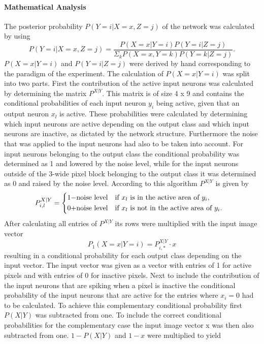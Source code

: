 \paragraph{Mathematical Analysis}
The posterior probability $P(Y = i|X = x, Z = j)$ of the network was calculated by using
\begin{equation}
\label{eqn:pYvorausgesetztXUndZ}
P(Y = i|X = x, Z = j) = \frac{P(X=x|Y=i)P(Y = i|Z = j)}{\Sigma_{k}P(X=x,Y=k)P(Y=k|Z=j)}.
\end{equation}
$P(X=x|Y=i)$ and $P(Y=i|Z=j)$ were derived by hand corresponding to the paradigm of the experiment. The calculation of $P(X=x|Y=i)$ was split into two parts. First the contribution of the active input neurons was calculated by determining the matrix $P^{X|Y}$. This matrix is of size 4 x 9 and contains the conditional probabilities of each input neuron $y_i$ being active, given that an output neuron $x_l$ is active. These probabilities were calculated by determining which input neurons are active depending on the output class and which input neurons are inactive, as dictated by the network structure.  Furthermore the noise that was applied to the input neurons had also to be taken into account. For input neurons belonging to the output class the conditional probability was determined as 1 and lowered by the noise level, while for the input neurons outside of the 3-wide pixel block belonging to the output class it was determined as 0 and raised by the noise level. According to this algorithm $P^{X|Y}$ is given by
\begin{equation}
\label{eqn:PXvorausgesetztYIf}
P_{i,l}^{X|Y} = \begin{dcases*} 1 - $noise level$ & if $x_l$ is in the active area of $y_i$, \\
0 + $noise level$ & \text{if $x_l$ is not in the active area of $ y_i $. } \end{dcases*}\end{equation}
  After calculating all entries of $P^{X|Y}$ its rows were multiplied with the input image vector
\begin{equation}
\label{eqn:p1XvorausgesetztYMalX}
P_1(X = x|Y = i) = P^{X|Y}_{i,*} \cdot x
\end{equation}
resulting in a conditional probability for each output class depending on the input vector. The input vector was given as a vector with entries of 1 for active pixels and with entries of 0 for inactive pixels.
Next to include the contribution of the input neurons that are spiking when a pixel is inactive the conditional probability of the input neurons that are active for the entries where $x_i = 0$ had to be calculated. To achieve this complementary conditional probability first $P(X|Y)$ was subtracted from one. To include the correct conditional probabilities for the complementary case the input image vector x was then also subtracted from one. $1 - P(X|Y)$ and $1 - x$ were multiplied to yield
